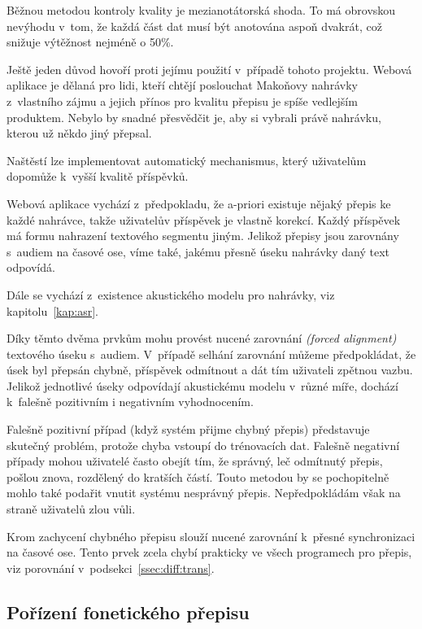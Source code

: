Běžnou metodou kontroly kvality je mezianotátorská shoda. To má obrovskou
nevýhodu v~tom, že každá část dat musí být anotována aspoň dvakrát, což snižuje
výtěžnost nejméně o 50\%.

Ještě jeden důvod hovoří proti jejímu použití v~případě tohoto projektu. Webová
aplikace je dělaná pro lidi, kteří chtějí poslouchat Makoňovy nahrávky
z~vlastního zájmu a jejich přínos pro kvalitu přepisu je spíše vedlejším
produktem. Nebylo by snadné přesvědčit je, aby si vybrali právě nahrávku, kterou
už někdo jiný přepsal.

Naštěstí lze implementovat automatický mechanismus, který uživatelům dopomůže
k~vyšší kvalitě příspěvků.

Webová aplikace vychází z~předpokladu, že a-priori existuje nějaký přepis ke
každé nahrávce, takže uživatelův příspěvek je vlastně korekcí. Každý příspěvek
má formu nahrazení textového segmentu jiným. Jelikož přepisy jsou zarovnány
s~audiem na časové ose, víme také, jakému přesně úseku nahrávky daný text
odpovídá.

Dále se vychází z~existence akustického modelu pro nahrávky, viz kapitolu~\ref{kap:asr}.

Díky těmto dvěma prvkům mohu provést nucené zarovnání {\em (forced alignment)} textového úseku
s~audiem. V~případě selhání zarovnání můžeme předpokládat, že úsek byl přepsán
chybně, příspěvek odmítnout a dát tím uživateli zpětnou vazbu. Jelikož
jednotlivé úseky odpovídají akustickému modelu v~různé míře, dochází k~falešně
pozitivním i negativním vyhodnocením.

Falešně pozitivní případ (když systém přijme chybný přepis) představuje skutečný
problém, protože chyba vstoupí do trénovacích dat. Falešně negativní případy
mohou uživatelé často obejít tím, že správný, leč odmítnutý přepis, pošlou
znova, rozdělený do kratších částí. Touto metodou by se pochopitelně mohlo také
podařit vnutit systému nesprávný přepis. Nepředpokládám však na straně uživatelů
zlou vůli.

Krom zachycení chybného přepisu slouží nucené zarovnání k~přesné synchronizaci
na časové ose. Tento prvek zcela chybí prakticky ve všech programech pro přepis,
viz porovnání v~podsekci~\ref{ssec:diff:trans}.

\subsection{Pořízení fonetického přepisu}
\label{ssec:porizeni-fonetickeho-prepisu}

